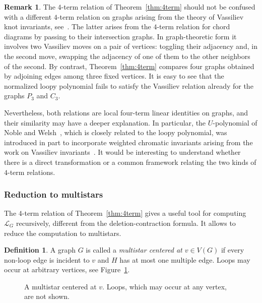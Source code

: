\documentclass[11pt]{article}
\theoremstyle{plain}
\theoremstyle{definition}
\newtheorem{definition}[theorem]{Definition}
\newtheorem{remark}[theorem]{Remark}
\renewcommand{\mathcal}{\mathscr}
\newcommand{\LL}{\mathcal{L}}    %
\numberwithin{equation}{section}
\begin{document}
\begin{remark}\label{rem:vassiliev-4term}
The $4$-term relation of Theorem~\ref{thm:4term} should not be confused with
a different $4$-term relation on graphs arising from the theory of Vassiliev knot invariants, see~\cite{Li,La}.
The latter arises from the $4$-term relation for chord diagrams by passing to their intersection graphs.
In graph-theoretic form it involves two Vassiliev moves on a pair of vertices: toggling their adjacency and, in the second move, swapping the adjacency of
one of them to the other neighbors of the second.
By contrast, Theorem~\ref{thm:4term} compares four graphs obtained by adjoining edges among
three fixed vertices.
It is easy to see that the normalized loopy polynomial fails to satisfy the Vassiliev
relation already for the graphs $P_3$ and $C_3$.

Nevertheless, both relations are local four-term linear identities on graphs,
and their similarity may have a deeper explanation.  In particular, the $U$-polynomial of Noble and Welsh~\cite{NW}, which is closely related to the
loopy polynomial, was introduced in part to incorporate weighted chromatic
invariants arising from the work on Vassiliev
invariants~\cite{CDL}.  It would be interesting to understand whether there is a direct
transformation or a common framework relating the two kinds of $4$-term relations.
\end{remark}


\subsubsection{Reduction to multistars}
\label{subsubsec:multistars}

The $4$-term relation of Theorem~\ref{thm:4term} gives
a useful tool for computing $\LL_G$ recursively, different from the deletion-contraction formula. It allows to reduce the computation to multistars.

\begin{definition}
\label{def:multistar}
A graph $G$ is called a
\emph{multistar centered at $v\in V(G)$} if every non-loop edge is incident to $v$ and
$H$ has at most one multiple edge.
Loops may occur at arbitrary vertices, see Figure~\ref{fig:multistar}.
\end{definition}

\begin{figure}[ht]
\centering
{}
\caption{A multistar centered at $v$.  Loops, which may occur at any vertex, are not shown.}
\label{fig:multistar}
\end{figure}
\end{document}
